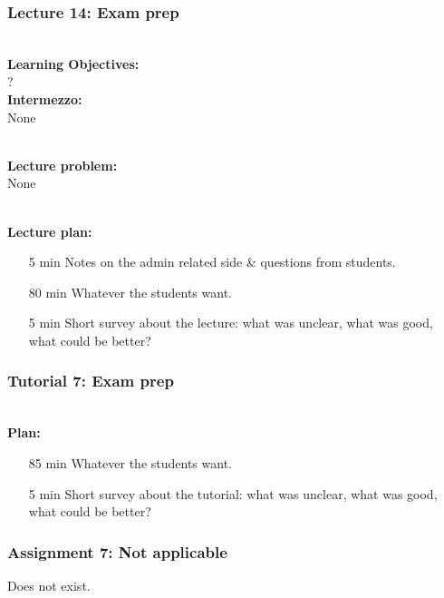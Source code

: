 \newpage
\subsubsection{Lecture 14: Exam prep}
\label{sub:lecture_14}

\hfill\\
\textbf{Learning Objectives:}\\
?
\hfill\\
\textbf{Intermezzo:}\\
None

\hfill\\
\textbf{Lecture problem:}\\
None

\hfill\\
\textbf{Lecture plan:}\\
\begin{itemize}
	\item[5 min] Notes on the admin related side \& questions from students.
	\item[80 min] Whatever the students want.
	\item[5 min] Short survey about the lecture: what was unclear, what was good, what could be better?
\end{itemize}

\newpage
\subsubsection{Tutorial 7: Exam prep}
\label{ssub:tutorial_7}

\hfill\\
\textbf{Plan:}\\
\begin{itemize}
	\item[85 min] Whatever the students want.
	\item[5 min] Short survey about the tutorial: what was unclear, what was good, what could be better?
\end{itemize}


\newpage
\subsubsection{Assignment 7: Not applicable}
\label{ssub:assignment_7}

Does not exist. 
